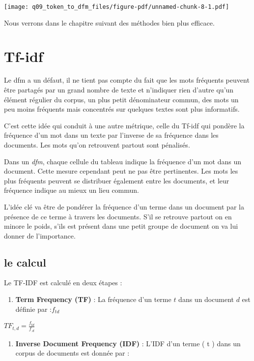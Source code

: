 \documentclass[
  letterpaper,
  DIV=11,
  numbers=noendperiod]{scrreprt}
\providecommand{\tightlist}{%
  \setlength{\itemsep}{0pt}\setlength{\parskip}{0pt}}\usepackage{longtable,booktabs,array}
\begin{document}
\texttt{[image: q09\_token\_to\_dfm\_files/figure-pdf/unnamed-chunk-8-1.pdf]}

Nous verrons dans le chapitre suivant des méthodes bien plus efficace.

\section{Tf-idf}\label{tf-idf}

Le dfm a un défaut, il ne tient pas compte du fait que les mots
fréquents peuvent être partagés par un grand nombre de texte et
n'indiquer rien d'autre qu'un élément régulier du corpus, un plus petit
dénominateur commun, des mots un peu moins fréquents mais concentrés sur
quelques textes sont plus informatifs.

C'est cette idée qui conduit à une autre métrique, celle du Tf-idf qui
pondère la fréquence d'un mot dans un texte par l'inverse de sa
fréquence dans les documents. Les mots qu'on retrouvent partout sont
pénalisés.

Dans un \emph{dfm}, chaque cellule du tableau indique la fréquence d'un
mot dans un document. Cette mesure cependant peut ne pas être
pertinentes. Les mots les plus fréquents peuvent se distribuer également
entre les documents, et leur fréquence indique au mieux un lieu commun.

L'idée clé va être de pondérer la fréquence d'un terme dans un document
par la présence de ce terme à travers les documents. S'il se retrouve
partout on en minore le poids, s'ils est présent dans une petit groupe
de document on va lui donner de l'importance.

\subsection{le calcul}\label{le-calcul}

Le TF-IDF est calculé en deux étapes :

\begin{enumerate}
\def\labelenumi{\arabic{enumi}.}
\tightlist
\item
  \textbf{Term Frequency (TF)} : La fréquence d'un terme \(t\) dans un
  document \(d\) est définie par :\(f_{td}\)
\end{enumerate}

\(TF_{t,d} = \frac{f_{td}}{f_{.d}}\)

\begin{enumerate}
\def\labelenumi{\arabic{enumi}.}
\setcounter{enumi}{1}
\tightlist
\item
  \textbf{Inverse Document Frequency (IDF)} : L'IDF d'un terme ( t )
  dans un corpus de documents est donnée par :
\end{enumerate}
\end{document}

